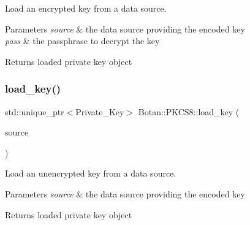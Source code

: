 Load an encrypted key from a data source. 
\begin{DoxyParams}{Parameters}
{\em source} & the data source providing the encoded key \\
\hline
{\em pass} & the passphrase to decrypt the key \\
\hline
\end{DoxyParams}
\begin{DoxyReturn}{Returns}
loaded private key object 
\end{DoxyReturn}
\mbox{\label{namespace_botan_1_1_p_k_c_s8_a0443f2ec21f8c932faff623dda025872}} 
\subsubsection{\texorpdfstring{load\+\_\+key()}{load\_key()}\hspace{0.1cm}{\footnotesize\ttfamily [3/3]}}
{\footnotesize\ttfamily std\+::unique\+\_\+ptr$<$Private\+\_\+\+Key$>$ Botan\+::\+P\+K\+C\+S8\+::load\+\_\+key (\begin{DoxyParamCaption}\item[{Data\+Source \&}]{source }\end{DoxyParamCaption})}

Load an unencrypted key from a data source. 
\begin{DoxyParams}{Parameters}
{\em source} & the data source providing the encoded key \\
\hline
\end{DoxyParams}
\begin{DoxyReturn}{Returns}
loaded private key object 
\end{DoxyReturn}
